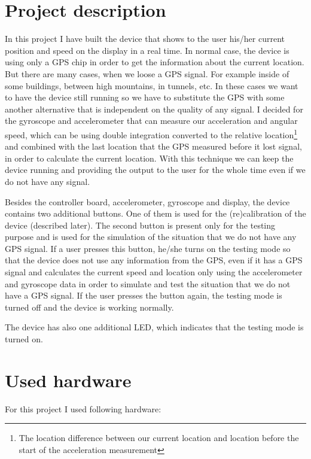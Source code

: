 \documentclass[hidelinks,a4paper]{article}
\begin{document}
\section{Project description}
In this project I have built the device that shows to the user his/her current position and speed on the display in a real time. In normal case, the device is using only a GPS chip in order to get the information about the current location. But there are many cases, when we loose a GPS signal. For example inside of some buildings, between high mountains, in tunnels, etc. In these cases we want to have the device still running so we have to substitute the GPS with some another alternative that is independent on the quality of any signal. I decided for the gyroscope and accelerometer that can measure our acceleration and angular speed, which can be using double integration converted to the relative location\footnote{The location difference between our current location and location before the start of the acceleration measurement} and combined with the last location that the GPS measured before it lost signal, in order to calculate the current location. With this technique we can keep the device running and providing the output to the user for the whole time even if we do not have any signal.\par
Besides the controller board, accelerometer, gyroscope and display, the device contains two additional buttons. One of them is used for the (re)calibration of the device (described later). The second button is present only for the testing purpose and is used for the simulation of the situation that we do not have any GPS signal. If a user presses this button, he/she turns on the testing mode so that the device does not use any information from the GPS, even if it has a GPS signal and calculates the current speed and location only using the accelerometer and gyroscope data in order to simulate and test the situation that we do not have a GPS signal. If the user presses the button again, the testing mode is turned off and the device is working normally.\par
The device has also one additional LED, which indicates that the testing mode is turned on.

\section{Used hardware}
For this project I used following hardware:
\end{document}
